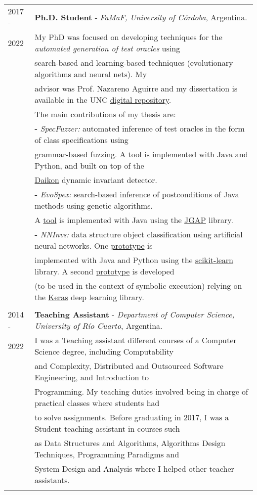 \documentclass[a4paper,10pt]{article} %
\begin{document}
\begin{longtable}{ll}
2017 - & \textbf{Ph.D. Student} - \textit{FaMaF, University of Córdoba}, Argentina. \\ 
2022 & My PhD was focused on developing techniques for the \textit{automated generation of test oracles} using \\
& search-based and learning-based techniques (evolutionary algorithms and neural nets). My \\
& advisor was Prof. Nazareno Aguirre and my dissertation is available in the UNC \href{https://rdu.unc.edu.ar/handle/11086/26692}{digital repository}. \\ 
& The main contributions of my thesis are: \\ 
& \textbf{-} \textit{SpecFuzzer:} automated inference of test oracles in the form of class specifications using \\
& grammar-based fuzzing. A \href{https://github.com/facumolina/specfuzzer}{tool} is implemented with Java and Python, and built on top of the \\ 
& \href{https://plse.cs.washington.edu/daikon/}{Daikon} dynamic invariant detector. \\ 
& \textbf{-} \textit{EvoSpex:} search-based inference of postconditions of Java methods using genetic algorithms. \\
& A \href{https://github.com/facumolina/evospex}{tool} is implemented with Java using the \href{https://homepages.ecs.vuw.ac.nz/~lensenandr/jgap/documentation/}{JGAP} library. \\ 
& \textbf{-} \textit{NNInvs:} data structure object classification using artificial neural networks. One \href{https://sites.google.com/site/learninginvariants}{prototype} is \\
& implemented with Java and Python using the \href{https://scikit-learn.org/stable/index.html}{scikit-learn} library. A second \href{https://sites.google.com/site/learninginvariants}{prototype} is developed \\ 
& (to be used in the context of symbolic execution) relying on the \href{https://keras.io/}{Keras} deep learning library. \\ & \\

2014 - & \textbf{Teaching Assistant} - \textit{Department of Computer Science, University of Río Cuarto}, Argentina. \\ 
2022 & I was a Teaching assistant different courses of a Computer Science degree, including Computability \\
& and Complexity, Distributed and Outsourced Software Engineering, and Introduction to \\
& Programming. My teaching duties involved being in charge of practical classes where students had \\  
& to solve assignments. Before graduating in 2017, I was a Student teaching assistant in courses such \\ 
& as Data Structures and Algorithms, Algorithms Design Techniques, Programming Paradigms and \\
& System Design and Analysis where I helped other teacher assistants. \\ & \\


\end{longtable}
\end{document}
